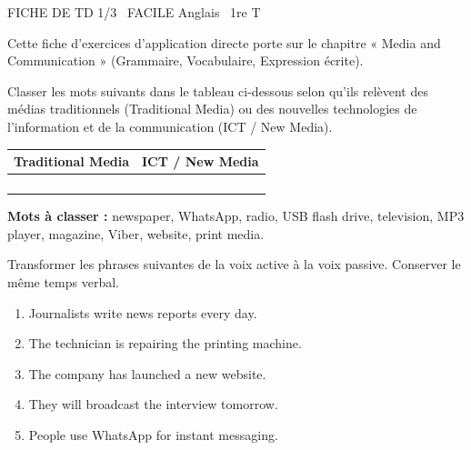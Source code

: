 \documentclass[11pt]{article}
\begin{document}
\begin{tcolorbox}[enhanced,colback=popink,colframe=popink,arc=10pt,boxrule=0pt,left=12pt,right=12pt,top=9pt,bottom=9pt]
{\color{white}\popxbold\small FICHE DE TD 1/3 \textbullet\ FACILE \hfill Anglais \textbullet\ 1re T\par}
\end{tcolorbox}
\vspace{4pt}
Cette fiche d'exercices d'application directe porte sur le chapitre « Media and Communication » (Grammaire, Vocabulaire, Expression écrite).

\begin{exercice}
Classer les mots suivants dans le tableau ci-dessous selon qu'ils relèvent des médias traditionnels (Traditional Media) ou des nouvelles technologies de l'information et de la communication (ICT / New Media).
\begin{center}
\begin{tabular}{|l|l|}
\hline
\textbf{Traditional Media} & \textbf{ICT / New Media} \\ \hline
 &  \\ \hline
 &  \\ \hline
 &  \\ \hline
 &  \\ \hline
\end{tabular}
\end{center}
\textbf{Mots à classer :} newspaper, WhatsApp, radio, USB flash drive, television, MP3 player, magazine, Viber, website, print media.
\end{exercice}

\begin{exercice}
Transformer les phrases suivantes de la voix active à la voix passive. Conserver le même temps verbal.
\begin{enumerate}
\item Journalists write news reports every day.
\item The technician is repairing the printing machine.
\item The company has launched a new website.
\item They will broadcast the interview tomorrow.
\item People use WhatsApp for instant messaging.
\end{enumerate}
\end{exercice}
\end{document}
